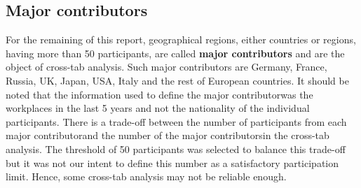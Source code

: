 \documentclass[preprint,5p,times]{elsarticle}
\def\mcountry{major contributor\xspace{}}%
\def\mcountries{major contributors\xspace{}}%
\def\Mcountries{Major contributors\xspace{}}%
\begin{document}
\subsection*{\Mcountries}

For the remaining of this report, geographical regions, either countries or
regions, having more than 50 participants, are called {\bf major contributors}
and are the object of cross-tab analysis. Such major contributors are Germany,
France, Russia, UK, Japan, USA, Italy and the rest of European countries. It
should be noted that the information used to define the \mcountry was the
workplaces in the last 5 years and not the nationality of the individual
participants.
%
There is a trade-off between the number of participants from each \mcountry and
the number of the \mcountries in the cross-tab analysis. The threshold of 50
participants was selected to balance this trade-off but it was not our intent to
define this number as a satisfactory participation limit. Hence, some cross-tab
analysis may not be reliable enough.
%
\end{document}
